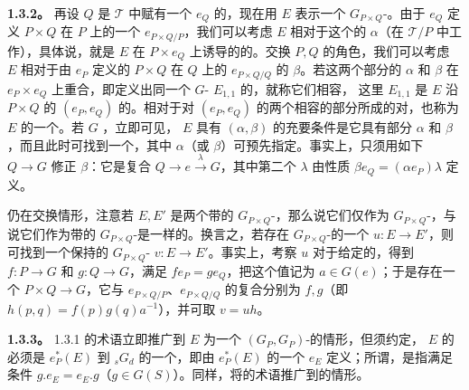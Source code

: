 \textbf{1.3.2。} 再设 $Q$ 是 $\mathcal T$ 中赋有一个 $e_Q$ 的，现在用 $E$ 表示一个 $G_{P\times Q}$-。由于 $e_Q$ 定义 $P\times Q$ 在 $P$ 上的一个 $e_{P\times Q/P}$，我们可以考虑 $E$ 相对于这个的 $\alpha$（在 $\mathcal T/P$ 中工作），具体说，就是 $E$ 在 $P\times e_Q$ 上诱导的的。交换 $P,Q$ 的角色，我们可以考虑 $E$ 相对于由 $e_P$ 定义的 $P\times Q$ 在 $Q$ 上的 $e_{P\times Q/Q}$ 的 $\beta$。若这两个部分的 $\alpha$ 和 $\beta$ 在 $e_P\times e_Q$ 上重合，即定义出同一个 $G$- $E_{1,1}$ 的，就称它们相容，
这里 $E_{1,1}$ 是 $E$ 沿 $P\times Q$ 的 $(e_P,e_Q)$ 的。相对于对 $(e_P,e_Q)$ 的两个相容的部分所成的对，也称为 $E$ 的一个。若 $G$ ，立即可见， $E$ 具有 $(\alpha,\beta)$ 的充要条件是它具有部分 $\alpha$ 和 $\beta$，而且此时可找到一个，其中 $\alpha$（或 $\beta$）可预先指定。事实上，只须用如下 $Q\to G$ 修正 $\beta$：它是复合 $Q\to e\xrightarrow{\lambda}G$，其中第二个 $\lambda$ 由性质 $\beta e_Q=(\alpha e_P)\lambda$ 定义。

仍在交换情形，注意若 $E,E'$ 是两个带的 $G_{P\times Q}$-，那么说它们仅作为 $G_{P\times Q}$-，与说它们作为带的 $G_{P\times Q}$-是一样的。换言之，若存在 $G_{P\times Q}$-的一个 $u:E\to E'$，则可找到一个保持的 $G_{P\times Q}$- $v:E\to E'$。事实上，考察 $u$ 对于给定的，得到 $f:P\to G$ 和 $g:Q\to G$，满足 $fe_P=ge_Q$，把这个值记为 $a\in G(e)$；于是存在一个 $P\times Q\to G$，它与 $e_{P\times Q/P}$、$e_{P\times Q/Q}$ 的复合分别为 $f,g$（即 $h(p,q)=f(p)g(q)a^{-1}$），并可取 $v=uh$。

\textbf{1.3.3。} 1.3.1 的术语立即推广到 $E$ 为一个 $(G_P,G_P)$-的情形，但须约定， $E$ 的必须是 $e_P^*(E)$ 到 ${}_sG_d$ 的一个，即由 $e_P^*(E)$ 的一个 $e_E$ 定义；所谓，是指满足条件 $g.e_E=e_E.g$（$g\in G(S)$）。同样，将的术语推广到的情形。


